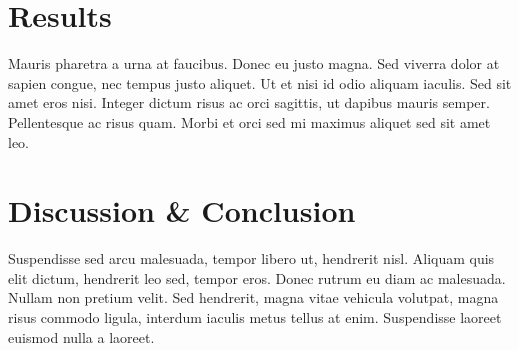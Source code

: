 \documentclass{article}
\theoremstyle{plain}
\theoremstyle{definition}
\theoremstyle{remark}
\begin{document}
\section{Results}\label{sec:results}


Mauris pharetra a urna at faucibus. Donec eu justo magna. Sed viverra dolor at sapien congue, nec tempus justo aliquet. Ut et nisi id odio aliquam iaculis. Sed sit amet eros nisi. Integer dictum risus ac orci sagittis, ut dapibus mauris semper. Pellentesque ac risus quam. Morbi et orci sed mi maximus aliquet sed sit amet leo. 



\section{Discussion \& Conclusion}\label{sec:conclusion}


Suspendisse sed arcu malesuada, tempor libero ut, hendrerit nisl. Aliquam quis elit dictum, hendrerit leo sed, tempor eros. Donec rutrum eu diam ac malesuada. Nullam non pretium velit. Sed hendrerit, magna vitae vehicula volutpat, magna risus commodo ligula, interdum iaculis metus tellus at enim. Suspendisse laoreet euismod nulla a laoreet.

\end{document}
